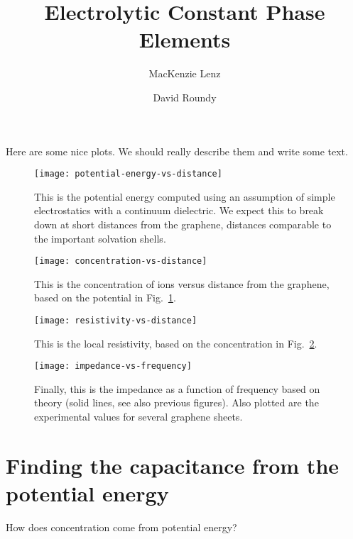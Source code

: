 \documentclass[twocolumn]{revtex4-1}
\begin{document}
\title{Electrolytic Constant Phase Elements}
\author{MacKenzie Lenz}
\author{David Roundy}


\maketitle

Here are some nice plots.  We should really describe them and write
some text.

\begin{figure}
  \texttt{[image: potential-energy-vs-distance]}
  \caption{This is the potential energy computed using an assumption
    of simple electrostatics with a continuum dielectric.  We expect
    this to break down at short distances from the graphene, distances
    comparable to the important solvation shells.}
  \label{fig:pot}
\end{figure}

\begin{figure}
  \texttt{[image: concentration-vs-distance]}
  \caption{This is the concentration of ions versus distance from the
    graphene, based on the potential in Fig.~\ref{fig:pot}.}
  \label{fig:concentration}
\end{figure}

\begin{figure}
  \texttt{[image: resistivity-vs-distance]}
  \caption{This is the local resistivity, based on the concentration
    in Fig.~\ref{fig:concentration}.}
\end{figure}

\begin{figure}
  \texttt{[image: impedance-vs-frequency]}
  \caption{Finally, this is the impedance as a function of frequency
    based on theory (solid lines, see also previous figures).  Also
    plotted are the experimental values for several graphene sheets.}
\end{figure}

\afterpage{\clearpage}

\clearpage

\section{Finding the capacitance from the potential energy}

How does concentration come from potential energy?
\end{document}
